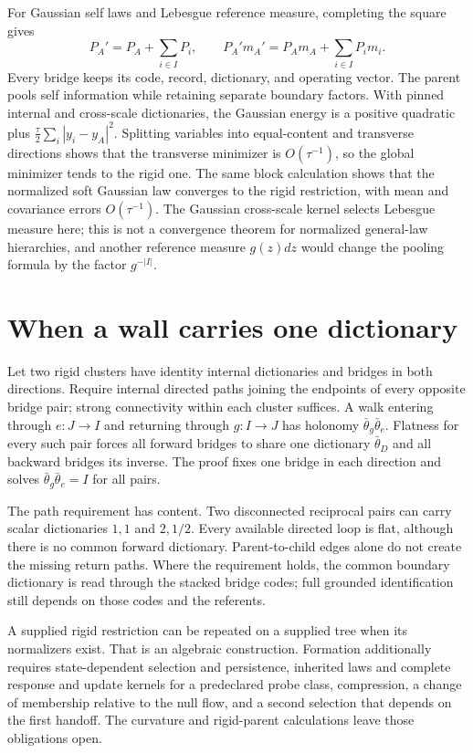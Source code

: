For Gaussian self laws and Lebesgue reference measure, completing the square gives
\begin{equation}
P_A'=P_A+\sum_{i\in I}P_i,\qquad
P_A'm_A'=P_Am_A+\sum_{i\in I}P_im_i.
\label{c19:pooling}
\end{equation}
Every bridge keeps its code, record, dictionary, and operating vector. The parent pools self information while retaining separate boundary factors. With pinned internal and cross-scale dictionaries, the Gaussian energy is a positive quadratic plus $\frac{\tau}{2}\sum_i|y_i-y_A|^2$. Splitting variables into equal-content and transverse directions shows that the transverse minimizer is $O(\tau^{-1})$, so the global minimizer tends to the rigid one. The same block calculation shows that the normalized soft Gaussian law converges to the rigid restriction, with mean and covariance errors $O(\tau^{-1})$. The Gaussian cross-scale kernel selects Lebesgue measure here; this is not a convergence theorem for normalized general-law hierarchies, and another reference measure $g(z)dz$ would change the pooling formula by the factor $g^{-|I|}$.

\section{When a wall carries one dictionary}

Let two rigid clusters have identity internal dictionaries and bridges in both directions. Require internal directed paths joining the endpoints of every opposite bridge pair; strong connectivity within each cluster suffices. A walk entering through $e:J\to I$ and returning through $g:I\to J$ has holonomy $\bar\theta_g\bar\theta_e$. Flatness for every such pair forces all forward bridges to share one dictionary $\bar\theta_D$ and all backward bridges its inverse. The proof fixes one bridge in each direction and solves $\bar\theta_g\bar\theta_e=I$ for all pairs.

The path requirement has content. Two disconnected reciprocal pairs can carry scalar dictionaries $1,1$ and $2,1/2$. Every available directed loop is flat, although there is no common forward dictionary. Parent-to-child edges alone do not create the missing return paths. Where the requirement holds, the common boundary dictionary is read through the stacked bridge codes; full grounded identification still depends on those codes and the referents.

A supplied rigid restriction can be repeated on a supplied tree when its normalizers exist. That is an algebraic construction. Formation additionally requires state-dependent selection and persistence, inherited laws and complete response and update kernels for a predeclared probe class, compression, a change of membership relative to the null flow, and a second selection that depends on the first handoff. The curvature and rigid-parent calculations leave those obligations open.
